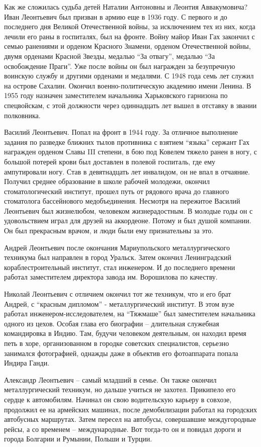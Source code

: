 Как же сложилась судьба детей Наталии Антоновны и Леонтия Аввакумовича? Иван
Леонтьевич был призван в армию еще в 1936 году. С первого и до последнего дня
Великой Отечественной войны, за исключением тех из них, когда лечили его раны в
госпиталях, был на фронте. Войну майор Иван Гах закончил с семью ранениями и
орденом Красного Знамени, орденом Отечественной войны, двумя орденами Красной
Звезды, медалью \enquote{За отвагу}, медалью \enquote{За освобождение Праги}. Уже после войны
он был награжден за безупречную  воинскую службу и другими орденами и медалями.
С 1948 года семь лет служил на острове Сахалин. Окончил военно-политическую
академию имени Ленина. В 1955 году назначен заместителем начальника
Харьковского гарнизона по спецвойскам, с этой должности через одиннадцать лет
вышел в отставку в звании полковника.

Василий Леонтьевич. Попал на фронт в 1944 году. За отличное выполнение задания
по разведке ближних тылов противника с взятием \enquote{языка} сержант Гах награжден
орденом Славы III степени,  в бою под Ковелем тяжело ранен в ногу, с большой
потерей крови был доставлен в полевой госпиталь, где ему ампутировали ногу.
Став в девятнадцать лет инвалидом, он не впал в отчаяние. Получил среднее
образование в школе рабочей молодежи, окончил стоматологический институт,
прошел путь от рядового врача до главного стоматолога бассейнового
медобъединения. Несмотря на пережитое Василий Леонтьевич был жизнелюбом,
человеком жизнерадостным. В молодые годы он с удовольствием играл для друзей на
аккордеоне. Потому и был душой компании. Он был прекрасным врачом, и люди были
ему признательны за это.

Андрей Леонтьевич после окончания  Мариупольского металлургического техникума
был направлен в город Уральск. Затем окончил Ленинградский кораблестроительный
институт, стал инженером. И до последнего времени работал заместителем
директора завода им. Ворошилова по качеству.

Николай Леонтьевич с отличием окончил тот же техникум, что и его брат Андрей, с
\enquote{красным дипломом} - металлургический институт. В этом вузе работал
инженером-исследователем, на \enquote{Тяжмаше} был заместителем начальника одного из
цехов. Особая глава его биографии – длительная служебная командировка в Индию.
Там, будучи человеком деятельным,  он находил время петь в хоре, организованном
в городке советских специалистов, серьезно занимался фотографией, однажды даже
в объектив его фотоаппарата попала Индира Ганди.

Александр Леонтьевич – самый младший в семье. Он также окончил металлургический
техникум, но дальше учиться не захотел. Прикипело его сердце к автомобилям.
Начинал он свою водительскую карьеру в совхозе, продолжил ее на армейских
машинах, после демобилизации работал на городских автобусных маршрутах. Затем
пересел на автобусы, совершавшие междугородные рейсы, а со временем –
международные. Вот тогда-то он и повидал дороги и города Болгарии и Румынии,
Польши и Турции.

